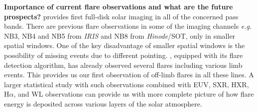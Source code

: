 \noindent
{\bf Importance of current {\suit} flare observations and what are the future prospects?} {\suit} provides first full-disk solar imaging in all of the concerned pass bands. There are previous flare observations in some of the imaging channels {\it e.g.} NB3, NB4 and NB5 from {\it IRIS} and NB8 from {\it Hinode}/SOT, only in smaller spatial windows. One of the key disadvantage of smaller spatial windows is the possibility of missing events due to different pointing. {\suit}, equipped with its flare detection algorithm, has already observed several flares including various limb events. This provides us our first observation of off-limb flares in all these lines. A larger statistical study with such observations combined with EUV, SXR, HXR, H$\alpha$, and WL observations can provide us with more complete picture of how flare energy is deposited across various layers of the solar atmosphere.  

